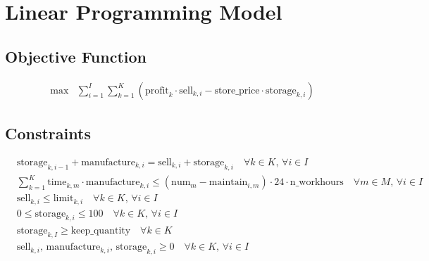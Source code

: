 \documentclass{article}
\begin{document}
\section*{Linear Programming Model}

\subsection*{Objective Function}
\begin{align*}
    \max & \sum_{i=1}^I \sum_{k=1}^K \left( \text{profit}_k \cdot \text{sell}_{k,i} - \text{store\_price} \cdot \text{storage}_{k, i} \right)
\end{align*}

\subsection*{Constraints}
\begin{align*}
    & \text{storage}_{k, i-1} + \text{manufacture}_{k, i} = \text{sell}_{k,i} + \text{storage}_{k, i} \quad \forall k \in K, \, \forall i \in I \\
    & \sum_{k=1}^K \text{time}_{k,m} \cdot \text{manufacture}_{k,i} \leq \left( \text{num}_m - \text{maintain}_{i,m} \right) \cdot 24 \cdot \text{n\_workhours} \quad \forall m \in M, \, \forall i \in I \\
    & \text{sell}_{k,i} \leq \text{limit}_{k,i} \quad \forall k \in K, \, \forall i \in I \\
    & 0 \leq \text{storage}_{k,i} \leq 100 \quad \forall k \in K, \, \forall i \in I \\
    & \text{storage}_{k,I} \geq \text{keep\_quantity} \quad \forall k \in K \\
    & \text{sell}_{k,i}, \, \text{manufacture}_{k,i}, \, \text{storage}_{k,i} \geq 0 \quad \forall k \in K, \, \forall i \in I
\end{align*}
\end{document}
